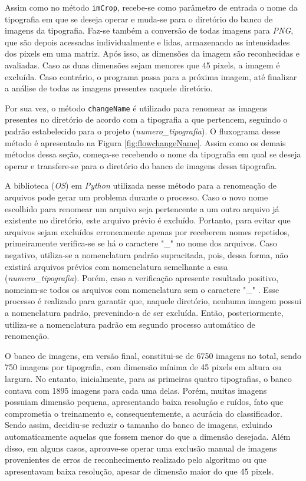 Assim como no método \texttt{imCrop}, recebe-se como parâmetro de entrada o nome da tipografia em que se deseja operar e muda-se para o diretório do banco de imagens da tipografia. Faz-se também a conversão de todas imagens para \textit{PNG}, que são depois acessadas individualmente e lidas, armazenando as intensidades dos pixels em uma matriz. Após isso, as dimensões da imagem são reconhecidas e avaliadas. Caso as duas dimensões sejam menores que 45 pixels, a imagem é excluída. Caso contrário, o programa passa para a próxima imagem, até finalizar a análise de todas as imagens presentes naquele diretório.

Por sua vez, o método \texttt{changeName} é utilizado para renomear as imagens presentes no diretório de acordo com a tipografia a que pertencem, seguindo o padrão estabelecido para o projeto (\textit{numero\_tipografia}). O fluxograma desse método é apresentado na Figura \ref{fig:flowchangeName}. Assim como os demais métodos dessa seção, começa-se recebendo o nome da tipografia em qual se deseja operar e transfere-se para o diretório do banco de imagens dessa tipografia.

A biblioteca (\textit{OS}) em \textit{Python} utilizada nesse método para a renomeação de arquivos pode gerar um problema durante o processo. Caso o novo nome escolhido para renomear um arquivo seja pertencente a um outro arquivo já existente no diretório, este arquivo prévio é excluído. Portanto, para evitar que arquivos sejam excluídos erroneamente apenas por receberem nomes repetidos, primeiramente verifica-se se há o caractere "\_" {} no nome dos arquivos. Caso negativo, utiliza-se a nomenclatura padrão supracitada, pois, dessa forma, não existirá arquivos prévios com nomenclatura semelhante a essa (\textit{numero\_tipografia}). Porém, caso a verificação apresente resultado positivo, nomeiam-se todos os arquivos com nomenclatura sem o caractere "\_" {}. Esse processo é realizado para garantir que, naquele diretório, nenhuma imagem possui a nomenclatura padrão, prevenindo-a de ser excluída. Então, posteriormente, utiliza-se a nomenclatura padrão em segundo processo automático de renomeação.


O banco de imagens, em versão final, constitui-se de 6750 imagens no total, sendo 750 imagens por tipografia, com dimensão mínima de 45 pixels em altura ou largura. No entanto, inicialmente, para as primeiras quatro tipografias, o banco contava com 1895 imagens para cada uma delas. Porém, muitas imagens possuiam dimensão pequena, apresentando baixa resolução e ruídos, fato que comprometia o treinamento e, consequentemente, a acurácia do classificador. Sendo assim, decidiu-se reduzir o tamanho do banco de imagens, exluindo automaticamente aquelas que fossem menor do que a dimensão desejada. Além disso, em alguns casos, aprouve-se operar uma exclusão manual de imagens provenientes de erros de reconhecimento realizado pelo algoritmo ou que apresentavam baixa resolução, apesar de dimensão maior do que 45 pixels.


